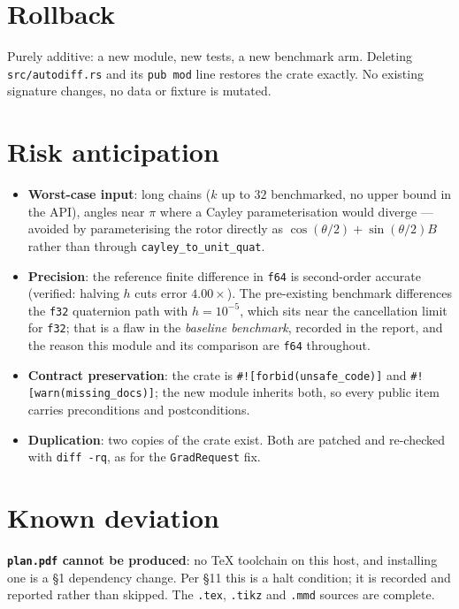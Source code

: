 \documentclass[11pt,a4paper]{article}
\begin{document}
\section{Rollback}
Purely additive: a new module, new tests, a new benchmark arm. Deleting
\texttt{src/autodiff.rs} and its \texttt{pub mod} line restores the crate exactly.
No existing signature changes, no data or fixture is mutated.

\section{Risk anticipation}
\begin{itemize}
  \item \textbf{Worst-case input}: long chains ($k$ up to $32$ benchmarked, no
        upper bound in the API), angles near $\pi$ where a Cayley
        parameterisation would diverge --- avoided by parameterising the rotor
        directly as $\cos(\theta/2) + \sin(\theta/2) B$ rather than through
        \texttt{cayley\_to\_unit\_quat}.
  \item \textbf{Precision}: the reference finite difference in \texttt{f64} is
        second-order accurate (verified: halving $h$ cuts error $4.00\times$).
        The pre-existing benchmark differences the \texttt{f32} quaternion path
        with $h=10^{-5}$, which sits near the cancellation limit for
        \texttt{f32}; that is a flaw in the \emph{baseline benchmark}, recorded
        in the report, and the reason this module and its comparison are
        \texttt{f64} throughout.
  \item \textbf{Contract preservation}: the crate is \texttt{\#![forbid(unsafe\_code)]}
        and \texttt{\#![warn(missing\_docs)]}; the new module inherits both, so
        every public item carries preconditions and postconditions.
  \item \textbf{Duplication}: two copies of the crate exist. Both are patched and
        re-checked with \texttt{diff -rq}, as for the \texttt{GradRequest} fix.
\end{itemize}

\section{Known deviation}
\textbf{\texttt{plan.pdf} cannot be produced}: no TeX toolchain on this host, and
installing one is a \S1 dependency change. Per \S11 this is a halt condition; it
is recorded and reported rather than skipped. The \texttt{.tex}, \texttt{.tikz}
and \texttt{.mmd} sources are complete.
\end{document}
